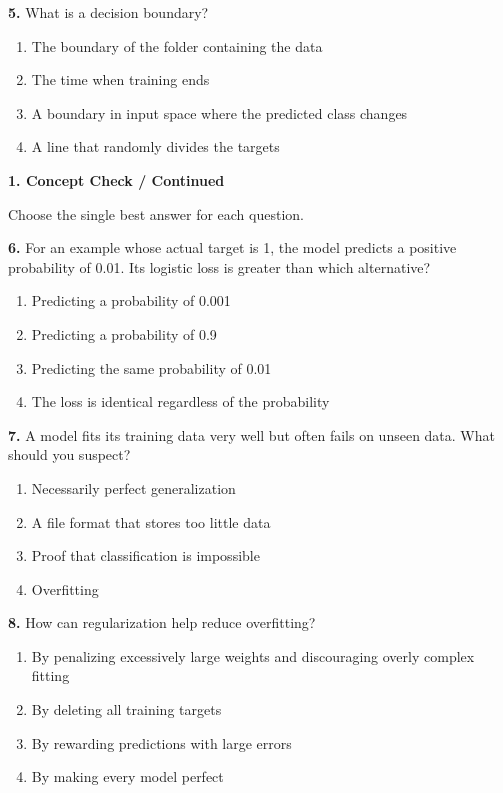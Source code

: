 \documentclass[11pt,a4paper]{article}
\newcommand{\parttitle}[2]{{\large\bfseries\color{ink} #1}\par{\small #2}\par\vspace{5mm}}
\newcommand{\question}[2]{\textbf{#1.} #2\par}
\begin{document}
\question{5}{What is a decision boundary?}
\begin{enumerate}[label=(\arabic*),leftmargin=9mm,itemsep=0pt,topsep=2pt,parsep=0pt]
\item The boundary of the folder containing the data
\item The time when training ends
\item A boundary in input space where the predicted class changes
\item A line that randomly divides the targets
\end{enumerate}\vfill
\newpage
\parttitle{1. Concept Check / Continued}{Choose the single best answer for each question.}
\question{6}{For an example whose actual target is 1, the model predicts a positive probability of 0.01. Its logistic loss is greater than which alternative?}
\begin{enumerate}[label=(\arabic*),leftmargin=9mm,itemsep=0pt,topsep=2pt,parsep=0pt]
\item Predicting a probability of 0.001
\item Predicting a probability of 0.9
\item Predicting the same probability of 0.01
\item The loss is identical regardless of the probability
\end{enumerate}\vfill
\question{7}{A model fits its training data very well but often fails on unseen data. What should you suspect?}
\begin{enumerate}[label=(\arabic*),leftmargin=9mm,itemsep=0pt,topsep=2pt,parsep=0pt]
\item Necessarily perfect generalization
\item A file format that stores too little data
\item Proof that classification is impossible
\item Overfitting
\end{enumerate}\vfill
\question{8}{How can regularization help reduce overfitting?}
\begin{enumerate}[label=(\arabic*),leftmargin=9mm,itemsep=0pt,topsep=2pt,parsep=0pt]
\item By penalizing excessively large weights and discouraging overly complex fitting
\item By deleting all training targets
\item By rewarding predictions with large errors
\item By making every model perfect
\end{enumerate}\vfill
\end{document}
